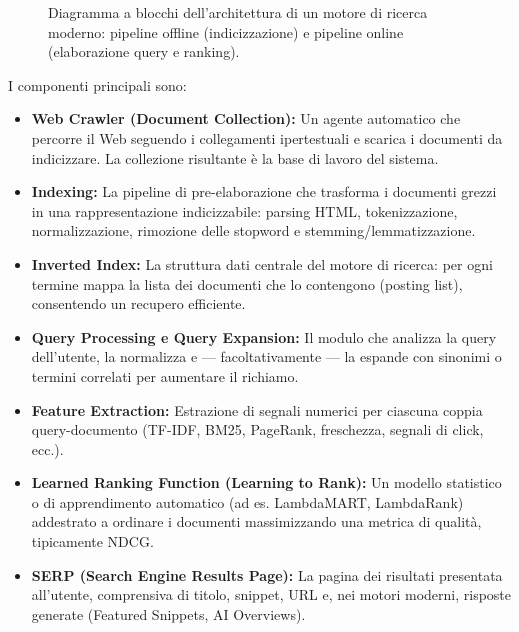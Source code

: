 \begin{figure}[H]
\caption{Diagramma a blocchi dell'architettura di un motore di ricerca moderno: pipeline offline (indicizzazione) e pipeline online (elaborazione query e ranking).}
\label{fig:architettura-motore}
\end{figure}

I componenti principali sono:
\begin{itemize}
    \item \textbf{Web Crawler (Document Collection):} Un agente automatico che percorre il Web seguendo i collegamenti ipertestuali e scarica i documenti da indicizzare. La collezione risultante è la base di lavoro del sistema.
    \item \textbf{Indexing:} La pipeline di pre-elaborazione che trasforma i documenti grezzi in una rappresentazione indicizzabile: parsing HTML, tokenizzazione, normalizzazione, rimozione delle stopword e stemming\slash lemmatizzazione.
    \item \textbf{Inverted Index:} La struttura dati centrale del motore di ricerca: per ogni termine mappa la lista dei documenti che lo contengono (posting list), consentendo un recupero efficiente.
    \item \textbf{Query Processing e Query Expansion:} Il modulo che analizza la query dell'utente, la normalizza e — facoltativamente — la espande con sinonimi o termini correlati per aumentare il richiamo.
    \item \textbf{Feature Extraction:} Estrazione di segnali numerici per ciascuna coppia query-documento (TF-IDF, BM25, PageRank, freschezza, segnali di click, ecc.).
    \item \textbf{Learned Ranking Function (Learning to Rank):} Un modello statistico o di apprendimento automatico (ad es. LambdaMART, LambdaRank) addestrato a ordinare i documenti massimizzando una metrica di qualità, tipicamente NDCG.
    \item \textbf{SERP (Search Engine Results Page):} La pagina dei risultati presentata all'utente, comprensiva di titolo, snippet, URL e, nei motori moderni, risposte generate (Featured Snippets, AI Overviews).
\end{itemize}

